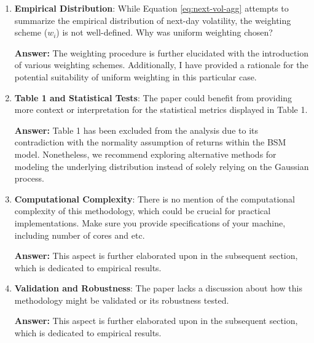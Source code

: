 \begin{enumerate}
    \textbf{Answer:}
    Table 1 has been excluded from the analysis due to its contradiction with the normality assumption of returns within the BSM model. Nonetheless, we recommend exploring alternative methods for modeling the underlying distribution instead of solely relying on the Gaussian process.
    
    \item \textbf{Empirical Distribution}: While Equation \eqref{eq:next-vol-agg} attempts to summarize the empirical distribution of next-day volatility, the weighting scheme ($w_i$) is not well-defined. Why was uniform weighting chosen?

    \textbf{Answer:}
    The weighting procedure is further elucidated with the introduction of various weighting schemes. Additionally, I have provided a rationale for the potential suitability of uniform weighting in this particular case.
    
    \item \textbf{Table 1 and Statistical Tests}: The paper could benefit from providing more context or interpretation for the statistical metrics displayed in Table 1. 

    \textbf{Answer:}
    Table 1 has been excluded from the analysis due to its contradiction with the normality assumption of returns within the BSM model. Nonetheless, we recommend exploring alternative methods for modeling the underlying distribution instead of solely relying on the Gaussian process.
    
    \item \textbf{Computational Complexity}: There is no mention of the computational complexity of this methodology, which could be crucial for practical implementations. Make sure you provide specifications of your machine, including number of cores and etc.

    \textbf{Answer:}
    This aspect is further elaborated upon in the subsequent section, which is dedicated to empirical results.
    
    \item \textbf{Validation and Robustness}: The paper lacks a discussion about how this methodology might be validated or its robustness tested.

    \textbf{Answer:}
    This aspect is further elaborated upon in the subsequent section, which is dedicated to empirical results.
\end{enumerate}